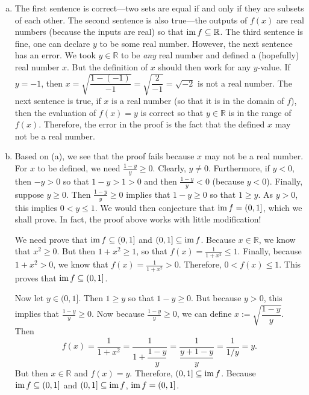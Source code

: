 \documentclass[11pt,letterpaper]{article}
\begin{document}
\sol 
\begin{enumerate}[(a)]
\item The first sentence is correct---two sets are equal if and only if they are subsets of each other. The second sentence is also true---the outputs of $f(x)$ are real numbers (because the inputs are real) so that $\operatorname{im} f \subseteq \mathbb{R}$. The third sentence is fine, one can declare $y$ to be some real number. However, the next sentence has an error. We took $y \in \mathbb{R}$ to be \textit{any} real number and defined a (hopefully) real number $x$. But the definition of $x$ should then work for any $y$-value. If $y= -1$, then $x= \sqrt{\dfrac{1 - (-1)}{-1}}= \sqrt{\dfrac{2}{-1}}= \sqrt{-2}$ is not a real number. The next sentence is true, if $x$ is a real number (so that it is in the domain of $f$), then the evaluation of $f(x)= y$ is correct so that $y \in \mathbb{R}$ is in the range of $f(x)$. Therefore, the error in the proof is the fact that the defined $x$ may not be a real number. \pspace

\item Based on (a), we see that the proof fails because $x$ may not be a real number. For $x$ to be defined, we need $\frac{1 - y}{y} \geq 0$. Clearly, $y \neq 0$. Furthermore, if $y < 0$, then $-y > 0$ so that $1 - y > 1 > 0$ and then $\frac{1 - y}{y} < 0$ (because $y < 0$). Finally, suppose $y \geq 0$. Then $\frac{1 - y}{y} \geq 0$ implies that $1 - y \geq 0$ so that $1 \geq y$. As $y > 0$, this implies $0 < y \leq 1$. We would then conjecture that $\operatorname{im} f= (0, 1]$, which we shall prove. In fact, the proof above works with little modification! \pspace

We need prove that $\operatorname{im} f \subseteq (0, 1]$ and $(0, 1] \subseteq \operatorname{im} f$. Because $x \in \mathbb{R}$, we know that $x^2 \geq 0$. But then $1 + x^2 \geq 1$, so that $f(x)= \frac{1}{1 + x^2} \leq 1$. Finally, because $1 + x^2 > 0$, we know that $f(x)= \frac{1}{1 + x^2} > 0$. Therefore, $0 < f(x) \leq 1$. This proves that $\operatorname{im} f \subseteq (0, 1]$. 

Now let $y \in (0, 1]$. Then $1 \geq y$ so that $1 - y \geq 0$. But because $y > 0$, this implies that $\frac{1 - y}{y} \geq 0$. Now because $\frac{1 - y}{y} \geq 0$, we can define $x:= \sqrt{\dfrac{1 - y}{y}}$. Then
	\[
	f(x)= \dfrac{1}{1 + x^2}= \dfrac{1}{1 + \dfrac{1 - y}{y}}= \dfrac{1}{\dfrac{y + 1 - y}{y}}= \dfrac{1}{1/y}= y.
	\]
But then $x \in \mathbb{R}$ and $f(x)= y$. Therefore, $(0, 1] \subseteq \operatorname{im} f$. Because $\operatorname{im} f \subseteq (0, 1]$ and $(0, 1] \subseteq \operatorname{im} f$, $\operatorname{im} f = (0, 1]$. \pspace


\end{enumerate}
\end{document}

